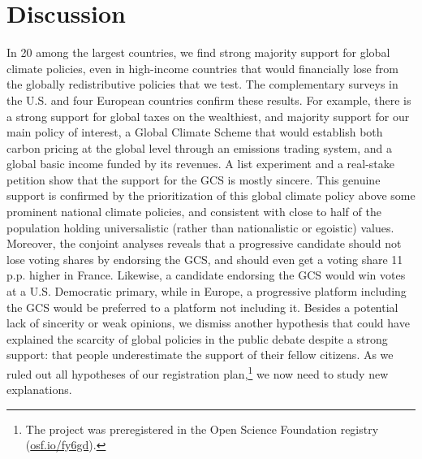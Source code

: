 \section{Discussion} %
In 20 among the largest countries, we find strong majority support for global climate policies, even in high-income countries that would financially lose from the globally redistributive policies that we test. The complementary surveys in the U.S. and four European countries confirm these results. For example, there is a strong support for global taxes on the wealthiest, and majority support for our main policy of interest, a Global Climate Scheme that would establish both carbon pricing at the global level through an emissions trading system, and a global basic income funded by its revenues. A list experiment and a real-stake petition show that the support for the GCS is mostly sincere. This genuine support is confirmed by the prioritization of this global climate policy above some prominent national climate policies, and consistent with close to half of the population holding universalistic (rather than nationalistic or egoistic) values. Moreover, the conjoint analyses reveals that a progressive candidate should not lose voting shares by endorsing the GCS, and should even get a voting share 11 p.p. higher in France. Likewise, a candidate endorsing the GCS would win votes at a U.S. Democratic primary, while in Europe, a progressive platform including the GCS would be preferred to a platform not including it. %
Besides a potential lack of sincerity or weak opinions, we dismiss another hypothesis that could have explained the scarcity of global policies in the public debate despite a strong support: that people underestimate the support of their fellow citizens. As we ruled out all hypotheses of our registration plan,\footnote{The project was preregistered in the Open Science Foundation registry (\href{https://osf.io/fy6gd}{osf.io/fy6gd}).} we now need to study new explanations. %

